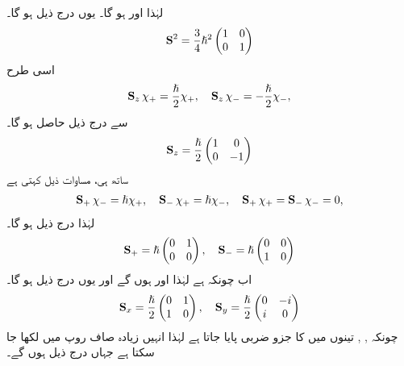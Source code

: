  لہٰذا  اور  ہو گا۔  یوں   درج ذیل ہو گا۔
 \begin{align} 
\operatorname{\mathbf{S}}^2= \frac{3}{4}\hslash^2 \begin{pmatrix} 1&0 \\ 0&1 \end{pmatrix} 
 \end{align} 
اسی طرح 
\begin{align} 
 \operatorname{\mathbf{S}}_{z}\chi_{+}=\frac{\hslash}{2}\chi_{+}, \quad \operatorname{\mathbf{S}}_{z} \chi_{-}=-\frac{\hslash}{2}\chi_{-}, 
 \end{align}
سے درج ذیل حاصل ہو گا۔
\begin{align}\label{مساوات_تین_ابعادی_زیڈ_چکری}
 \operatorname{\mathbf{S}}_{z}= \frac{\hslash}{2}\begin{pmatrix} 1&0 \\ 0&-1 \end{pmatrix} 
 \end{align}
ساتھ ہی،  مساوات    ذیل کہتی ہے
\begin{align*} 
 \operatorname{\mathbf{S}}_{+} \chi_{-}=\hslash \chi_+, \quad \operatorname{\mathbf{S}}_{-}\chi_{+}=\hslash \chi_- ,\quad  \operatorname{\mathbf{S}}_{+} \chi_{+}= \operatorname{\mathbf{S}}_{-} \chi_{-}=0, 
 \end{align*}
لہٰذا درج ذیل ہو گا۔
\begin{align}\label{مساوات_تین_ابعادی_چکر_رفعت_وغیرہ}
 \operatorname{\mathbf{S}}_{+}=\hslash\begin{pmatrix} 0&1 \\ 0&0 \end{pmatrix} , \quad \operatorname{\mathbf{S}}_{-}=\hslash\begin{pmatrix}0&0 \\ 1&0 \end{pmatrix} 
 \end{align}
 اب     چونکہ   ہے لہٰذا     اور  ہوں گے اور یوں  درج ذیل ہو گا۔
\begin{align}\label{مساوات_تین_ابعادی_دو_چکری}  
 \operatorname{\mathbf{S}}_{x}=\frac{\hslash}{2}\begin{pmatrix} 0&1 \\1&0 \end{pmatrix} , \quad \operatorname{\mathbf{S}}_{y}=\frac{\hslash}{2}\begin{pmatrix} 0&-i \\ i& 0 \end{pmatrix}
 \end{align}
چونکہ  ,  ,  تینوں میں  کا جزو  ضربی پایا جاتا ہے لہٰذا انہیں زیادہ صاف روپ  میں  لکھا جا سکتا ہے جہاں درج ذیل ہوں گے۔
